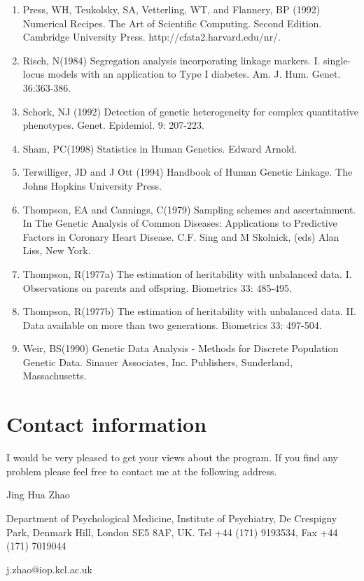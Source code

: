 \documentclass[12pt]{article}
\begin{document}
\begin{enumerate}
\item Press, WH, Teukolsky, SA, Vetterling, WT, and Flannery, BP (1992) Numerical Recipes. 
The Art of Scientific Computing. Second Edition. Cambridge University Press. 
http://cfata2.harvard.edu/nr/.

\item Risch, N(1984) Segregation analysis incorporating linkage markers. I. single-locus models
with an application to Type I diabetes. Am. J. Hum. Genet. 36:363-386. 

\item Schork, NJ (1992) Detection of genetic heterogeneity for complex quantitative
phenotypes.  Genet. Epidemiol. 9: 207-223.

\item Sham, PC(1998) Statistics in Human Genetics. Edward Arnold. 

\item Terwilliger, JD and J Ott (1994) Handbook of Human Genetic Linkage. The Johns Hopkins
University Press.

\item Thompson, EA and Cannings, C(1979) Sampling schemes and ascertainment. In The Genetic
Analysis of Common Diseases: Applications to Predictive Factors in Coronary Heart Disease.
C.F.  Sing and M Skolnick, (eds) Alan Liss, New York. 

\item Thompson, R(1977a) The estimation of heritability with unbalanced data. I. Observations
on parents and offspring. Biometrics 33: 485-495. 

\item Thompson, R(1977b) The estimation of heritability with unbalanced data. II. Data
available on more than two generations. Biometrics 33: 497-504. 

\item Weir, BS(1990) Genetic Data Analysis - Methods for Discrete Population Genetic Data.
Sinauer Associates, Inc. Publishers, Sunderland, Massachusetts.
\end{enumerate}

\section{Contact information}

I would be very pleased to get your views about the program. If you find any problem please 
feel free to contact me at the following address.

\bigskip

Jing Hua Zhao

Department of Psychological Medicine, Institute of Psychiatry, De Crespigny Park, Denmark
Hill, London SE5 8AF, UK. Tel +44 (171) 9193534, Fax +44 (171) 7019044

j.zhao@iop.kcl.ac.uk
\end{document}
